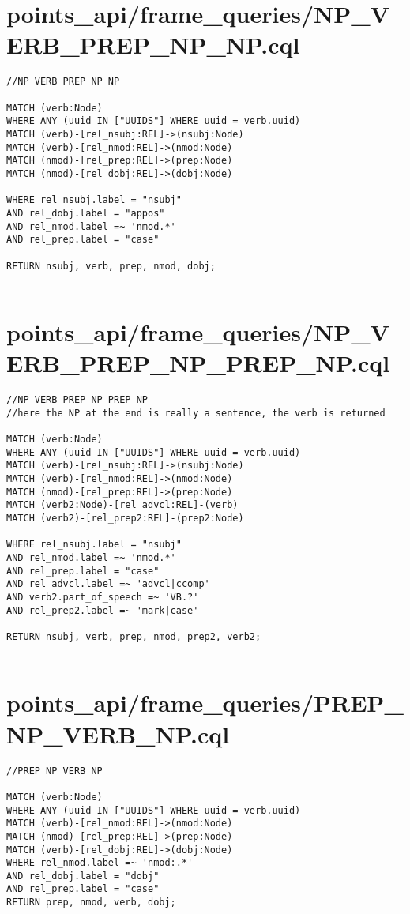 \documentclass{article}
\begin{document}
\section*{points\_api/frame\_queries/NP\_VERB\_PREP\_NP\_NP.cql}
\begin{verbatim}
//NP VERB PREP NP NP

MATCH (verb:Node)
WHERE ANY (uuid IN ["UUIDS"] WHERE uuid = verb.uuid)
MATCH (verb)-[rel_nsubj:REL]->(nsubj:Node)
MATCH (verb)-[rel_nmod:REL]->(nmod:Node)
MATCH (nmod)-[rel_prep:REL]->(prep:Node)
MATCH (nmod)-[rel_dobj:REL]->(dobj:Node)

WHERE rel_nsubj.label = "nsubj"
AND rel_dobj.label = "appos"
AND rel_nmod.label =~ 'nmod.*'
AND rel_prep.label = "case"

RETURN nsubj, verb, prep, nmod, dobj;


\end{verbatim}
\pagebreak

\section*{points\_api/frame\_queries/NP\_VERB\_PREP\_NP\_PREP\_NP.cql}
\begin{verbatim}
//NP VERB PREP NP PREP NP
//here the NP at the end is really a sentence, the verb is returned

MATCH (verb:Node)
WHERE ANY (uuid IN ["UUIDS"] WHERE uuid = verb.uuid)
MATCH (verb)-[rel_nsubj:REL]->(nsubj:Node)
MATCH (verb)-[rel_nmod:REL]->(nmod:Node)
MATCH (nmod)-[rel_prep:REL]->(prep:Node)
MATCH (verb2:Node)-[rel_advcl:REL]-(verb)
MATCH (verb2)-[rel_prep2:REL]-(prep2:Node)

WHERE rel_nsubj.label = "nsubj"
AND rel_nmod.label =~ 'nmod.*'
AND rel_prep.label = "case"
AND rel_advcl.label =~ 'advcl|ccomp'
AND verb2.part_of_speech =~ 'VB.?'
AND rel_prep2.label =~ 'mark|case'

RETURN nsubj, verb, prep, nmod, prep2, verb2;


\end{verbatim}
\pagebreak

\section*{points\_api/frame\_queries/PREP\_NP\_VERB\_NP.cql}
\begin{verbatim}
//PREP NP VERB NP

MATCH (verb:Node)
WHERE ANY (uuid IN ["UUIDS"] WHERE uuid = verb.uuid)
MATCH (verb)-[rel_nmod:REL]->(nmod:Node)
MATCH (nmod)-[rel_prep:REL]->(prep:Node)
MATCH (verb)-[rel_dobj:REL]->(dobj:Node)
WHERE rel_nmod.label =~ 'nmod:.*'
AND rel_dobj.label = "dobj"
AND rel_prep.label = "case"
RETURN prep, nmod, verb, dobj;


\end{verbatim}
\pagebreak
\end{document}
